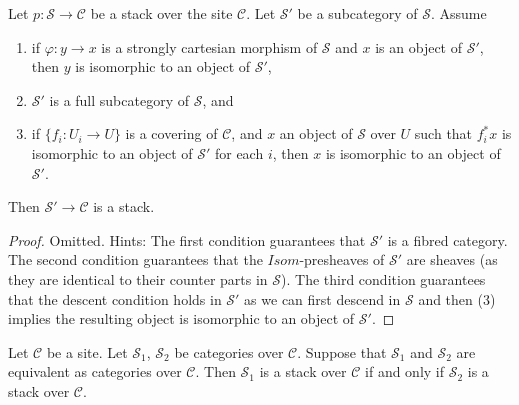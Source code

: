 \begin{lemma}
\label{lemma-substack}
Let $p : \mathcal{S} \to \mathcal{C}$ be a stack over the site $\mathcal{C}$.
Let $\mathcal{S}'$ be a subcategory of $\mathcal{S}$.
Assume
\begin{enumerate}
\item if $\varphi : y \to x$ is a strongly cartesian
morphism of $\mathcal{S}$ and
$x$ is an object of $\mathcal{S}'$, then $y$ is isomorphic to an
object of $\mathcal{S}'$,
\item $\mathcal{S}'$ is a full subcategory of $\mathcal{S}$, and
\item if $\{f_i : U_i \to U\}$ is a covering of $\mathcal{C}$,
and $x$ an object of $\mathcal{S}$ over $U$ such that $f_i^*x$
is isomorphic to an object of $\mathcal{S}'$ for each $i$,
then $x$ is isomorphic to an object of $\mathcal{S}'$.
\end{enumerate}
Then $\mathcal{S}' \to \mathcal{C}$ is a stack.
\end{lemma}

\begin{proof}
Omitted. Hints:
The first condition guarantees that $\mathcal{S}'$ is a fibred category.
The second condition guarantees that the $\mathit{Isom}$-presheaves
of $\mathcal{S}'$ are sheaves (as they are identical to their counter parts
in $\mathcal{S}$). The third condition guarantees that the descent condition
holds in $\mathcal{S}'$ as we can first descend in $\mathcal{S}$ and
then (3) implies the resulting object is isomorphic to an object of
$\mathcal{S}'$.
\end{proof}

\begin{lemma}
\label{lemma-stack-equivalent}
Let $\mathcal{C}$ be a site.
Let $\mathcal{S}_1$, $\mathcal{S}_2$ be categories over $\mathcal{C}$.
Suppose that $\mathcal{S}_1$ and $\mathcal{S}_2$ are equivalent
as categories over $\mathcal{C}$.
Then $\mathcal{S}_1$ is a stack over $\mathcal{C}$ if and only if
$\mathcal{S}_2$ is a stack over $\mathcal{C}$.
\end{lemma}

